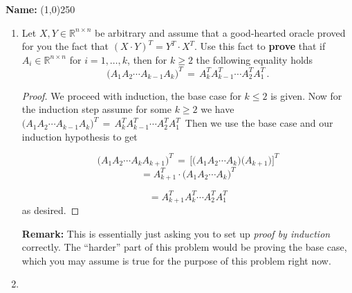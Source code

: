\documentclass[11pt,table]{article}
\newcommand{\<}			{\langle}
\renewcommand{\>}      		{\rangle}
\def\Rnn{\mathbb{R}^{n\times n}}
\begin{document}
	\vspace*{9mm}
	
	\noindent
	{\bf Name:} \line(1,0){250}  \\
	
	\vspace*{8mm}


\vspace{5mm}


\newpage


\begin{enumerate}


\item Let $X, Y \in \Rnn$ be arbitrary and assume that a good-hearted oracle 
	proved for you  the fact that  
	$ (X \cdot Y ) ^T = Y^T \cdot X^T$. 
	Use this fact to {\bf prove} that if $A_i \in \mathbb{R}^{n \times n} $ for $i=1,\ldots, k$, 
	then for $k \geq 2$ the following equality holds 
	\begin{equation} \label{eqn-prob1}
	\Big(A_1A_2\cdots A_{k-1} A_k \Big)^T \, = \, A_k^TA_{k-1}^T \cdots A_2^T A_1^T \, .
	\end{equation} 

	
	\begin{proof}
		We proceed with induction, the base case for $k \leq 2$ is given. Now for the induction step assume for some 
		$k \geq 2$ we have $\Big(A_1A_2\cdots A_{k-1} A_k \Big)^T \, = \, A_k^TA_{k-1}^T \cdots A_2^T A_1^T \,$ 
		Then we use the base case and our induction hypothesis to get
		
			\[\Big(A_1A_2\cdots A_{k} A_{k+1} \Big)^T \, = \, \Big[\Big(A_1A_2\cdots A_{k} \Big) \Big( A_{k+1}\Big)\Big]^T \] 
			\[\, = A_{k+1}^T \cdot \Big(A_1A_2\cdots A_{k} \big)^T \, \]

			\[= A_{k+1}^TA_k^T \cdots A_2^T A_1^T\]
		as desired. 

	\end{proof}

	
{\bf Remark:} 
This is essentially just asking you 
to set up {\em proof by induction} correctly. 
The ``harder'' part of this problem would be proving the base case, 
which you may assume is true for the purpose of this problem right now. 

\medskip
\item \quad {\, } 


\end{enumerate}
\end{document}
